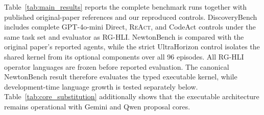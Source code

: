 \documentclass[letterpaper]{article}
\newcommand{\methodshort}{\textsc{RG-HLI}\xspace}
\newcommand{\react}{\textsc{ReAct}\xspace}
\newcommand{\codeact}{CodeAct\xspace}
\newcommand{\gptmini}{GPT-4o-mini\xspace}
\begin{document}
Table~\ref{tab:main_results} reports the complete benchmark runs together with
published original-paper references and our reproduced controls. DiscoveryBench
includes complete \gptmini Direct, \react, and \codeact controls under the same
task set and evaluator as \methodshort. NewtonBench is compared with the
original paper's reported agents, while the strict UltraHorizon control
isolates the shared kernel from its optional components over all 96 episodes.
All \methodshort operator languages are frozen before reported evaluation. The
canonical NewtonBench result therefore evaluates the typed executable kernel,
while development-time language growth is tested separately below.
Table~\ref{tab:core_substitution} additionally shows that the executable
architecture remains operational with Gemini and Qwen proposal cores.
\end{document}
